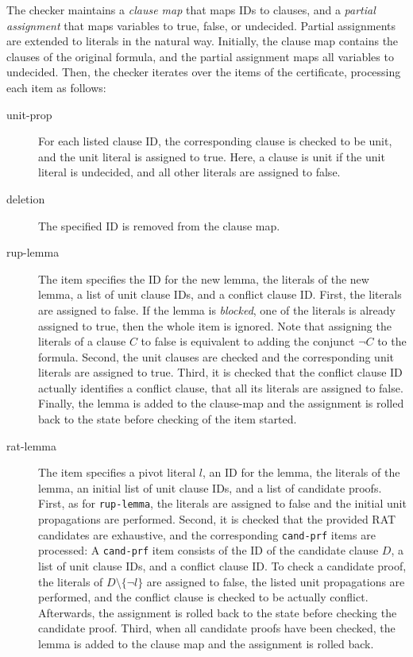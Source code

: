 \documentclass{llncs}
\newcommand{\lsti}{\lstinline[language={},literate={}]}
\begin{document}
The checker maintains a \emph{clause map} that maps IDs to clauses, and a \emph{partial assignment} that maps variables to true, false, or undecided. 
Partial assignments are extended to literals in the natural way.
Initially, the clause map contains the clauses of the original formula, and the partial assignment maps all variables to undecided.
Then, the checker iterates over the items of the certificate, processing each item as follows:
\begin{description}
  \item[unit-prop] 
    For each listed clause ID, the corresponding clause is checked to be unit, and the unit literal is assigned to true.
    Here, a clause is unit if the unit literal is undecided, and all other literals are assigned to false.
  \item[deletion] The specified ID is removed from the clause map.
  \item[rup-lemma] The item specifies the ID for the new lemma, the literals of the new lemma, a list of unit clause IDs, and a conflict clause ID.
      First, the literals are assigned to false. If the lemma is \emph{blocked}, \ie one of the literals is already assigned to true, then the whole item is ignored.
        Note that assigning the literals of a clause $C$ to false is equivalent to adding the conjunct $\neg C$ to the formula. 
      Second, the unit clauses are checked and the corresponding unit literals are assigned to true.
      Third, it is checked that the conflict clause ID actually identifies a conflict clause, \ie that all its literals are assigned to false.
      Finally, the lemma is added to the clause-map and the assignment is rolled back to the state before checking of the item started.
    \item[rat-lemma] The item specifies a pivot literal $l$, an ID for the lemma, the literals of the lemma, an initial list of unit clause IDs, and a list of
      candidate proofs. 
      First, as for \lsti{rup-lemma}, the literals are assigned to false and the initial unit propagations are performed. 
      Second, it is checked that the provided RAT candidates are exhaustive, and the corresponding \lsti{cand-prf} items are processed:
      A \lsti{cand-prf} item consists of the ID of the candidate clause $D$, a list of unit clause IDs, and a conflict clause ID.
      To check a candidate proof, the literals of $D\setminus\{\neg l\}$ are assigned to false, the listed unit propagations are performed, and the conflict clause is 
      checked to be actually conflict. Afterwards, the assignment is rolled back to the state before checking the candidate proof.
      Third, when all candidate proofs have been checked, the lemma is added to the clause map and the assignment is rolled back.


\end{description}
\end{document}
